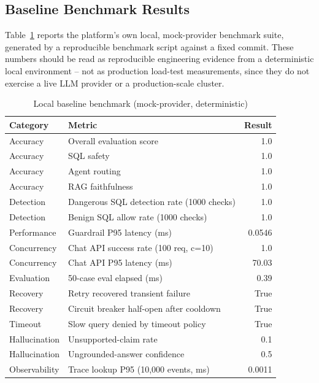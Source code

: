 \documentclass[conference]{IEEEtran}
\begin{document}
\subsection{Baseline Benchmark Results}
Table~\ref{tab:benchmark} reports the platform's own local,
mock-provider benchmark suite, generated by a reproducible benchmark
script against a fixed commit. These numbers should be read as
reproducible engineering evidence from a deterministic local environment
-- not as production load-test measurements, since they do not exercise a
live LLM provider or a production-scale cluster.

\begin{table}[t]
\centering
\caption{Local baseline benchmark (mock-provider, deterministic)}
\label{tab:benchmark}
\scriptsize
\begin{tabular}{@{}p{1.7cm}p{3.1cm}r@{}}
\toprule
\textbf{Category} & \textbf{Metric} & \textbf{Result} \\
\midrule
Accuracy & Overall evaluation score & 1.0 \\
Accuracy & SQL safety & 1.0 \\
Accuracy & Agent routing & 1.0 \\
Accuracy & RAG faithfulness & 1.0 \\
Detection & Dangerous SQL detection rate (1000 checks) & 1.0 \\
Detection & Benign SQL allow rate (1000 checks) & 1.0 \\
Performance & Guardrail P95 latency (ms) & 0.0546 \\
Concurrency & Chat API success rate (100 req, c=10) & 1.0 \\
Concurrency & Chat API P95 latency (ms) & 70.03 \\
Evaluation & 50-case eval elapsed (ms) & 0.39 \\
Recovery & Retry recovered transient failure & True \\
Recovery & Circuit breaker half-open after cooldown & True \\
Timeout & Slow query denied by timeout policy & True \\
Hallucination & Unsupported-claim rate & 0.1 \\
Hallucination & Ungrounded-answer confidence & 0.5 \\
Observability & Trace lookup P95 (10{,}000 events, ms) & 0.0011 \\
\bottomrule
\end{tabular}
\end{table}
\end{document}
